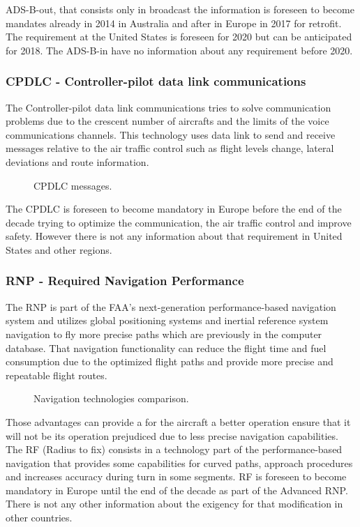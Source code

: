 ADS-B-out, that consists only in broadcast the information is foreseen to become mandates already in 2014 in Australia and after in Europe in 2017 for retrofit. The requirement at the United States is foreseen for 2020 but can be anticipated for 2018. The ADS-B-in have no information about any requirement before 2020.

\subsubsection{CPDLC - Controller-pilot data link communications}
The Controller-pilot data link communications tries to solve communication problems due to the crescent number of aircrafts and the limits of the voice communications channels. This technology uses data link to send and receive messages relative to the air traffic control such as flight levels change, lateral deviations and route information.
\begin{figure}[H] %
\caption{CPDLC messages.}
\label{fig:CPDLCmessages}
\end{figure} 
The CPDLC is foreseen to become mandatory in Europe before the end of the decade  trying to optimize the communication, the air traffic control and improve safety. However there is not any information about that requirement in United States and other regions.


\subsubsection{RNP - Required Navigation Performance}
The RNP is part of the FAA's next-generation performance-based navigation system and utilizes global positioning systems and inertial reference system navigation to fly more precise paths which are previously in the computer database. That navigation functionality can reduce the flight time and fuel consumption due to the optimized flight paths and provide more precise and repeatable flight routes. 

\begin{figure}[H] %
\caption{Navigation technologies comparison.}
\label{fig:NavigationTechnologiesComparison}
\end{figure} 

Those advantages can provide a for the aircraft a better operation ensure that it will not be its operation prejudiced due to less precise navigation capabilities.
\\The RF (Radius to fix) consists in a technology part of the performance-based navigation that provides some capabilities for curved paths, approach procedures and increases accuracy during turn in some segments. RF is foreseen to become mandatory in Europe until the end of the decade as part of the Advanced RNP. There is not any other information about the exigency for that modification in other countries.

